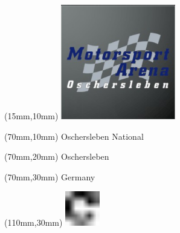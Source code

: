 \null\newpage
\begin{textblock*}{50mm}(15mm,10mm)%
\includegraphics[width=50mm]{LG/2015-05-20_00090.png}
\end{textblock*}
\begin{textblock*}{130mm}(70mm,10mm)%
{\fontsize{20}{20}\selectfont Oschersleben National}\\
\end{textblock*}
\begin{textblock*}{120mm}(70mm,20mm)%
{\fontsize{16}{16}\selectfont Oschersleben}\\
\end{textblock*}
\begin{textblock*}{120mm}(70mm,30mm)%
{\fontsize{12}{12}\selectfont Germany}
\end{textblock*}
\begin{textblock*}{30mm}(110mm,30mm)%
\centering
\includegraphics[height=15mm]{icons/fa-rotate-right.pdf}
\end{textblock*}
